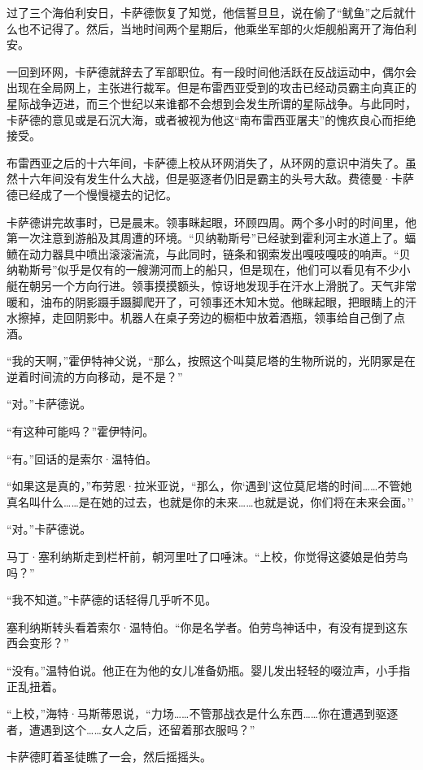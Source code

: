 \documentclass[AutoFakeBold=true]{book}
\begin{document}
过了三个海伯利安日，卡萨德恢复了知觉，他信誓旦旦，说在偷了``鱿鱼''之后就什么也不记得了。然后，当地时间两个星期后，他乘坐军部的火炬舰船离开了海伯利安。

一回到环网，卡萨德就辞去了军部职位。有一段时间他活跃在反战运动中，偶尔会出现在全局网上，主张进行裁军。但是布雷西亚受到的攻击已经动员霸主向真正的星际战争迈进，而三个世纪以来谁都不会想到会发生所谓的星际战争。与此同时，卡萨德的意见或是石沉大海，或者被视为他这``南布雷西亚屠夫''的愧疚良心而拒绝接受。

布雷西亚之后的十六年间，卡萨德上校从环网消失了，从环网的意识中消失了。虽然十六年间没有发生什么大战，但是驱逐者仍旧是霸主的头号大敌。费德曼·卡萨德已经成了一个慢慢褪去的记忆。

\vspace*{1em}

卡萨德讲完故事时，已是晨末。领事眯起眼，环顾四周。两个多小时的时间里，他第一次注意到游船及其周遭的环境。``贝纳勒斯号''已经驶到霍利河主水道上了。蝠鲼在动力器具中喷出滚滚湍流，与此同时，链条和钢索发出嘎吱嘎吱的响声。``贝纳勒斯号''似乎是仅有的一艘溯河而上的船只，但是现在，他们可以看见有不少小艇在朝另一个方向行进。领事摸摸额头，惊讶地发现手在汗水上滑脱了。天气非常暖和，油布的阴影蹑手蹑脚爬开了，可领事还木知木觉。他眯起眼，把眼睛上的汗水擦掉，走回阴影中。机器人在桌子旁边的橱柜中放着酒瓶，领事给自己倒了点酒。

``我的天啊，''霍伊特神父说，``那么，按照这个叫莫尼塔的生物所说的，光阴冢是在逆着时间流的方向移动，是不是？''

``对。''卡萨德说。

``有这种可能吗？''霍伊特问。

``有。''回话的是索尔·温特伯。

``如果这是真的，''布劳恩·拉米亚说，``那么，你`遇到'这位莫尼塔的时间……不管她真名叫什么……是在她的过去，也就是你的未来……也就是说，你们将在未来会面。''

``对。''卡萨德说。

马丁·塞利纳斯走到栏杆前，朝河里吐了口唾沫。``上校，你觉得这婆娘是伯劳鸟吗？''

``我不知道。''卡萨德的话轻得几乎听不见。

塞利纳斯转头看着索尔·温特伯。``你是名学者。伯劳鸟神话中，有没有提到这东西会变形？''

``没有。''温特伯说。他正在为他的女儿准备奶瓶。婴儿发出轻轻的啜泣声，小手指正乱扭着。

``上校，''海特·马斯蒂恩说，``力场……不管那战衣是什么东西……你在遭遇到驱逐者，遭遇到这个……女人之后，还留着那衣服吗？''

卡萨德盯着圣徒瞧了一会，然后摇摇头。
\end{document}
